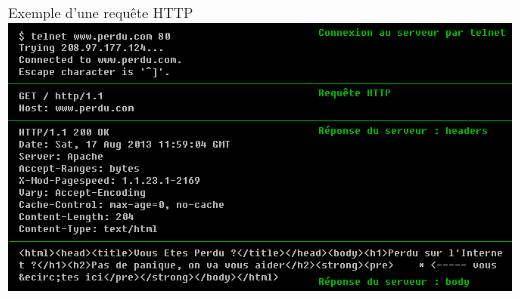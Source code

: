 
\begin{frame}{Exemple d'une requête HTTP}
    \includegraphics[width=\linewidth]{../medias/perdu.png}
\end{frame}


